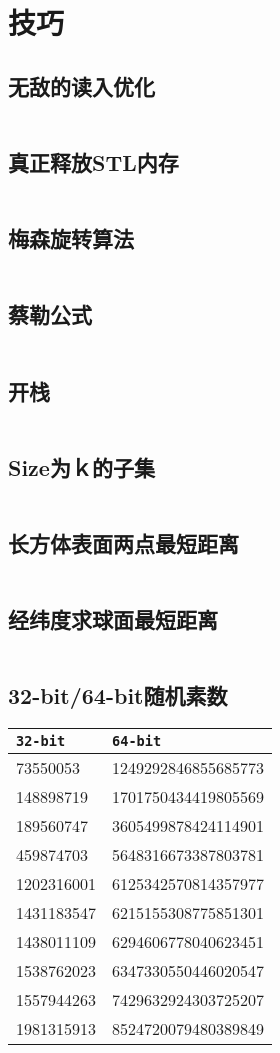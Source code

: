 \chapter{技巧}
\section{无敌的读入优化}
\inputminted{cpp}{\source/hints/input-acceleration.cpp}
\section{真正释放STL内存}
\inputminted{cpp}{\source/hints/STL-memory-release.cpp}
\section{梅森旋转算法}
\inputminted{cpp}{\source/hints/STL-memory-release.cpp}
\section{蔡勒公式}
\inputminted{cpp}{\source/hints/zeller.cpp}
\section{开栈}
\inputminted{cpp}{\source/hints/openstack.cpp}
\section{Size为ｋ的子集}
\inputminted{cpp}{\source/hints/subset-of-size-k.cpp}
\section{长方体表面两点最短距离}
\inputminted{cpp}{\source/hints/长方体表面两点最短距离.cpp}
\section{经纬度求球面最短距离}
\inputminted{cpp}{\source/hints/经纬度求球面最短距离.cpp}
\section{32-bit/64-bit随机素数}
\begin{tabular}{|l|l|}
	\hline
	\texttt{32-bit} & \texttt{64-bit} \\
	\hline
	73550053 & 1249292846855685773 \\
	\hline
	148898719 & 1701750434419805569 \\
	\hline
	189560747 & 3605499878424114901 \\
	\hline
	459874703 & 5648316673387803781 \\
	\hline
	1202316001 & 6125342570814357977 \\
	\hline
	1431183547 & 6215155308775851301 \\
	\hline
	1438011109 & 6294606778040623451 \\
	\hline
	1538762023 & 6347330550446020547 \\
	\hline
	1557944263 & 7429632924303725207 \\
	\hline
	1981315913 & 8524720079480389849 \\
	\hline
\end{tabular}

